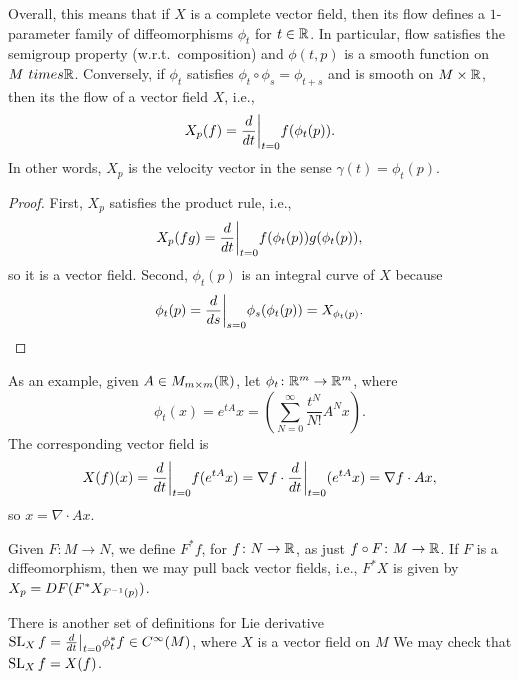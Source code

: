 Overall, this means that if $X$ is a complete vector field, then its flow defines a $1$-parameter family of diffeomorphisms $\phi_t$ for $t \in \mathbb R$. In particular, flow satisfies the semigroup property (w.r.t.\ composition) and $\phi(t, p)$ is a smooth function on $M\ times \mathbb R$. Conversely, if $\phi_t$ satisfies $\phi_t \circ \phi_s = \phi_{t + s}$ and is smooth on $M \times \mathbb R$, then its the flow of a vector field $X$, i.e.,
\[ X_p (f) = \restr{\frac{d}{dt}}{t=0} f(\phi_t(p)). \]
In other words, $X_p$ is the velocity vector in the sense $\gamma(t) = \phi_t(p)$.
\begin{proof}
    First, $X_p$ satisfies the product rule, i.e.,
    \[ X_p(fg) = \restr{\frac{d}{dt}}{t=0} f(\phi_t(p)) g(\phi_t(p)), \]
    so it is a vector field. Second, $\phi_t(p)$ is an integral curve of $X$ because
    \[ \phi_t(p) = \restr{\frac{d}{ds}}{s=0} \phi_s(\phi_t(p)) = X_{\phi_t(p)}. \qedhere \]
\end{proof}
As an example, given $A \in M_{m \times m}(\mathbb R)$, let $\phi_t \colon \mathbb R^m \to \mathbb R^m$, where
\[ \phi_t(x) = e^{tA} x = \left(\sum_{N=0}^\infty \frac{t^N}{N!} A^N x\right). \]
The corresponding vector field is
\[ X(f)(x) = \restr{\frac{d}{dt}}{t=0} f(e^{tA} x) = \nabla f \cdot \restr{\frac{d}{dt}}{t=0}(e^{tA}x) = \nabla f \cdot A x, \]
so $x = \nabla \cdot Ax$.
\begin{definition}[Pullback]
    Given $F \colon M \to N$, we define $F^\ast f$, for $f \colon N \to \mathbb R$, as just $f \circ F \colon M \to \mathbb R$. If $F$ is a diffeomorphism, then we may pull back vector fields, i.e., $F^\ast X$ is given by $X_p = DF(F^\ast X_{F^{-1}(p)})$.
\end{definition}
There is another set of definitions for Lie derivative $\SL_X f = \restr{\frac{d}{dt}}{t=0} \phi_t^\ast f \in C^\infty(M)$, where $X$ is a vector field on $M$ We may check that $\operatorname{SL}_X f = X(f)$.